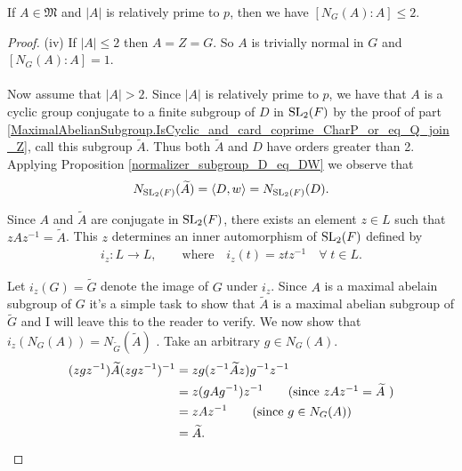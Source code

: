 \begin{theorem}
  \label{MaximalAbelianSubgroup.index_normalizer_le_two}
  \leanok
If $A \in \mathfrak{M}$ and $|A|$ is relatively prime to $p$, then we have $[N_G(A): A] \leq 2$. 

\end{theorem}
\begin{proof}
  (iv) If $|A| \leq 2$ then $A=Z=G$. So $A$ is trivially normal in $G$ and $[N_G(A): A] = 1$. \\
  \\
  Now assume that $|A| > 2$. Since $|A|$ is relatively prime to $p$, we have that $A$ is a cyclic group conjugate to a finite subgroup of $D$ in $\operatorname{SL}_2(F)$ by the proof of part \ref{MaximalAbelianSubgroup.IsCyclic_and_card_coprime_CharP_or_eq_Q_join_Z}, call this subgroup ${\widetilde{A}}$. Thus both ${\widetilde{A}}$ and $D$ have orders greater than 2. Applying Proposition \ref{normalizer_subgroup_D_eq_DW} we observe that
  \begin{align}\label{norm1}  N_{\operatorname{SL}_2(F)}({\widetilde{A}}) = \langle D , w \rangle = N_{\operatorname{SL}_2(F)}(D).
  \end{align}
  
  Since $A$ and ${\widetilde{A}}$ are conjugate in $\operatorname{SL}_2(F)$, there exists an element $z \in L$ such that $zAz^{-1} = {\widetilde{A}}$. This $z$ determines an inner automorphism of $\operatorname{SL}_2(F)$ defined by
  \begin{align*} 
      i_z: L \longrightarrow L,  \qquad \text{where} \quad  i_z(t) = z t z^{-1}  \quad \forall \; t \in L.
  \end{align*}
  
  Let $i_z(G) = {\widetilde{G}}$ denote the image of $G$ under $i_z$. Since $A$ is a maximal abelain subgroup of $G$ it's a simple task to show that ${\widetilde{A}}$ is a maximal abelian subgroup of ${\widetilde{G}}$ and I will leave this to the reader to verify. We now show that $i_z(N_G(A)) = N_{\widetilde{G}}({\widetilde{A}})$ . Take an arbitrary $g \in N_G(A)$.
  \begin{align*} (z g z^{-1}) {\widetilde{A}} (z g z^{-1})^{-1} &= z g (z^{-1} {\widetilde{A}} z) g^{-1} z^{-1}
  \\ &=  z (g A g^{-1}) z^{-1} \tag{since $zAz^{-1} = {\widetilde{A}}$ }
  \\ &= z A z^{-1} \tag{since $g \in N_G(A)$}
  \\ &= {\widetilde{A}}.
  \end{align*}
  

\end{proof}
